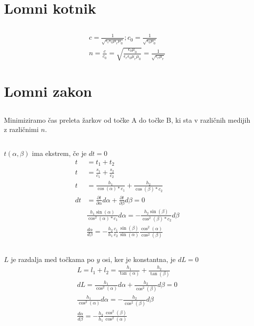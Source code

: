 \documentclass[a4paper,12pt]{article}
\begin{document}
\newpage

\section{Lomni kotnik}
\subsection{}
\begin{align}
    c = \frac{1}{\sqrt{\epsilon_r \epsilon_0 \mu_r \mu_0}}; c_0 = \frac{1}{\sqrt{\epsilon_0\mu_0}} \\
    n = \frac{c}{c_0} = \sqrt{\frac{\epsilon_0\mu_0}{\epsilon_r \epsilon_0 \mu_r \mu_0}} = \frac{1}{\sqrt{\epsilon_r \mu_r}}
\end{align}

\newpage

\section{Lomni zakon}
\subsection{}
Minimiziramo čas preleta žarkov od točke A do točke B, ki sta v različnih medijih z različnimi $n$.

\subsection{}
$t(\alpha, \beta)$ ima ekstrem, če je $dt = 0$
\begin{align}
    t &= t_1 + t_2 \\
    t &= \frac{s_1}{c_1} + \frac{s_2}{c_2} \\
    t &= \frac{h_1}{\cos(\alpha) * c_1} + \frac{h_2}{\cos(\beta) * c_2} \\
    dt &= \frac{\partial t}{\partial \alpha} d\alpha + \frac{\partial t}{\partial \beta} d\beta = 0 \\
    &\frac{h_1 \sin(\alpha)}{\cos^2(\alpha) * c_1} d\alpha = -\frac{h_2 \sin(\beta)}{\cos^2(\beta) * c_2} d\beta \\
    &\frac{d \alpha}{d \beta} = - \frac{h_2}{h_1} \frac{c_1}{c_2} \frac{\sin(\beta)}{\sin(\alpha)} \frac{\cos^2(\alpha)}{\cos^2(\beta)}
\end{align}

\subsection{}
$L$ je razdalja med točkama po $y$ osi, ker je konstantna, je $dL = 0$
\begin{align}
    L = l_1 + l_2 = \frac{h_1}{\tan(\alpha)} + \frac{h_2}{\tan(\beta)} \\
    dL = \frac{h_1}{\cos^2(\alpha)} d\alpha + \frac{h_2}{\cos^2(\beta)} d\beta = 0 \\
    \frac{h_1}{\cos^2(\alpha)} d\alpha = -\frac{h_2}{\cos^2(\beta)} d\beta \\
    \frac{d \alpha}{d \beta} = -\frac{h_2}{h_1} \frac{\cos^2(\beta)}{\cos^2(\alpha)}
\end{align}
\end{document}

